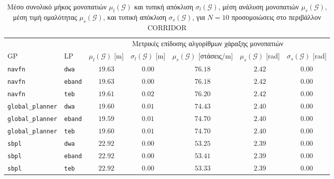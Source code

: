 \begin{table}[h]
\renewcommand{\arraystretch}{1.3}
\begin{tabular}{llccccc}
  & & \multicolumn{5}{c}{Μετρικές επίδοσης αλγορίθμων χάραξης μονοπατιών} \\
  \cline{3-7}
  GP & LP & $\mu_{l}(\bm{\mathcal{G}})$ [m] & $\sigma_{l}(\bm{\mathcal{G}})$ [m] & $\mu_r(\bm{\mathcal{G}})$ [στάσεις/m] & $\mu_{s}(\bm{\mathcal{G}})$ [rad] & $\sigma_{s}(\bm{\mathcal{G}})$ [rad] \\ \toprule
  \texttt{navfn} & \texttt{dwa} & $19.63$ & $0.00$ & $76.18$ & $2.42$ & $0.00$ \\
  \texttt{navfn} & \texttt{eband} & $19.63$ & $0.00$ & $76.18$ & $2.42$ & $0.00$ \\
  \texttt{navfn} & \texttt{teb} & $19.61$ & $0.02$ & $76.20$ & $2.42$ & $0.00$ \\
  \texttt{global\_planner} & \texttt{dwa} & $19.60$ & $0.01$ & $74.43$ & $2.40$ & $0.00$ \\
  \texttt{global\_planner} & \texttt{eband} & $19.59$ & $0.01$ & $74.70$ & $2.40$ & $0.00$ \\
  \texttt{global\_planner} & \texttt{teb} & $19.60$ & $0.01$ & $74.70$ & $2.40$ & $0.00$ \\
  \texttt{sbpl} & \texttt{dwa} & $22.92$ & $0.00$ & $53.25$ & $2.39$ & $0.00$ \\
  \texttt{sbpl} & \texttt{eband} & $22.92$ & $0.00$ & $53.41$ & $2.39$ & $0.00$ \\
  \texttt{sbpl} & \texttt{teb} & $22.92$ & $0.00$ & $53.33$ & $2.39$ & $0.00$ \\ \bottomrule
\end{tabular}
\caption{\small Μέσο συνολικό μήκος μονοπατιών $\mu_{l}(\bm{\mathcal{G}})$ και
         τυπική απόκλιση $\sigma_{l}(\bm{\mathcal{G}})$, μέση ανάλυση
         μονοπατιών $\mu_r(\bm{\mathcal{G}})$, μέση τιμή ομαλότητας
         $\mu_{s}(\bm{\mathcal{G}})$, και τυπική απόκλιση
         $\sigma_{s}(\bm{\mathcal{G}})$, για $N=10$ προσομοιώσεις στο
         περιβάλλον CORRIDOR}
\label{tbl:info_global_plan_corridor}
\end{table}

